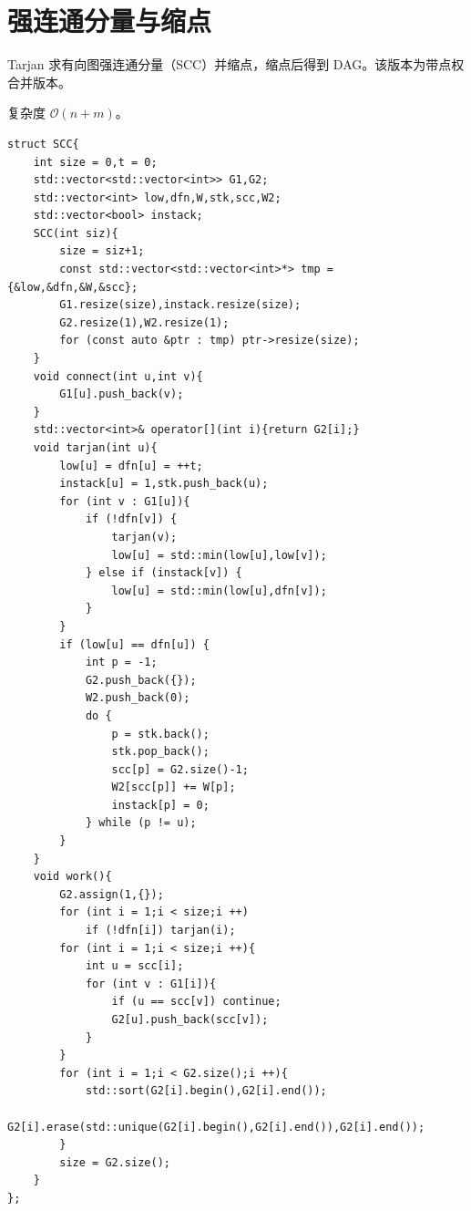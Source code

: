 \section{强连通分量与缩点}

Tarjan 求有向图强连通分量（SCC）并缩点，缩点后得到 DAG。该版本为带点权合并版本。

复杂度 $\mathcal{O}(n+m)$。

\begin{lstlisting}
struct SCC{
    int size = 0,t = 0;
    std::vector<std::vector<int>> G1,G2;
    std::vector<int> low,dfn,W,stk,scc,W2;
    std::vector<bool> instack;
    SCC(int siz){
        size = siz+1;
        const std::vector<std::vector<int>*> tmp = {&low,&dfn,&W,&scc};
        G1.resize(size),instack.resize(size);
        G2.resize(1),W2.resize(1);
        for (const auto &ptr : tmp) ptr->resize(size);
    }
    void connect(int u,int v){
        G1[u].push_back(v);
    }
    std::vector<int>& operator[](int i){return G2[i];}
    void tarjan(int u){
        low[u] = dfn[u] = ++t;
        instack[u] = 1,stk.push_back(u);
        for (int v : G1[u]){
            if (!dfn[v]) {
                tarjan(v);
                low[u] = std::min(low[u],low[v]);
            } else if (instack[v]) {
                low[u] = std::min(low[u],dfn[v]);
            }
        }
        if (low[u] == dfn[u]) {
            int p = -1;
            G2.push_back({});
            W2.push_back(0);
            do {
                p = stk.back();
                stk.pop_back();
                scc[p] = G2.size()-1;
                W2[scc[p]] += W[p];
                instack[p] = 0;
            } while (p != u);
        }
    }
    void work(){
        G2.assign(1,{});
        for (int i = 1;i < size;i ++)
            if (!dfn[i]) tarjan(i);
        for (int i = 1;i < size;i ++){
            int u = scc[i];
            for (int v : G1[i]){
                if (u == scc[v]) continue;
                G2[u].push_back(scc[v]);
            }
        }
        for (int i = 1;i < G2.size();i ++){
            std::sort(G2[i].begin(),G2[i].end());
            G2[i].erase(std::unique(G2[i].begin(),G2[i].end()),G2[i].end());
        }
        size = G2.size();
    }
};
\end{lstlisting}

